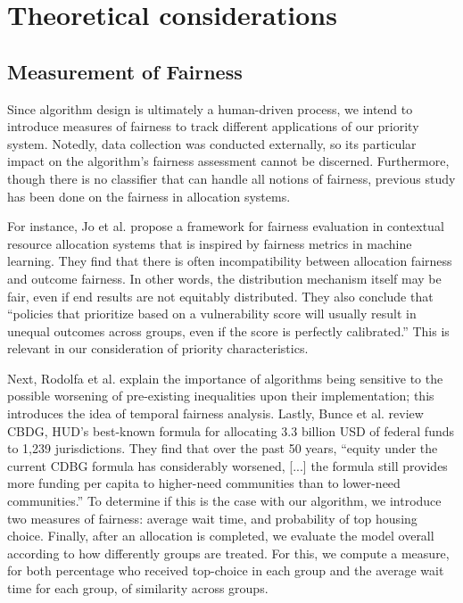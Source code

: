 \documentclass[11pt]{article}
\begin{document}
\section{Theoretical considerations}

\subsection{Measurement of Fairness}

Since algorithm design is ultimately a human-driven process, we intend to introduce measures
of fairness to track different applications of our priority system. Notedly, data collection was conducted externally, so its particular impact on the algorithm’s fairness assessment cannot be discerned. Furthermore, though there is no classifier that can handle all notions of fairness, previous study has been done on the fairness in allocation systems.

For instance, Jo et al. \cite{formulaeval3} propose a framework
for fairness evaluation in contextual resource allocation systems that is inspired by fairness
metrics in machine learning. They find that there is often incompatibility between allocation
fairness and outcome fairness. In other words, the distribution mechanism itself may be fair,
even if end results are not equitably distributed. They also conclude that “policies that prioritize based on a vulnerability score will usually result in unequal outcomes across groups, even if the score is perfectly calibrated.” This is relevant in our consideration of priority characteristics.

Next, Rodolfa et al.\cite{formulaeval2} explain the importance of algorithms being sensitive to
the possible worsening of pre-existing inequalities upon their implementation; this introduces the idea of temporal fairness analysis. Lastly, Bunce et al. \cite{formulaeval} review CBDG,
HUD's best-known formula for allocating 3.3 billion USD of federal funds to 1,239 jurisdictions. They find that over the past 50 years, “equity under the current CDBG formula has considerably worsened, [...] the formula still provides more funding per capita to higher-need communities than to lower-need communities.” To determine if this is the case with our algorithm, we introduce two measures of fairness: average wait time, and probability of top housing choice. Finally, after an allocation is completed, we evaluate the model overall according to how differently groups are treated. For this, we compute a measure, for both percentage who received top-choice in each group and the average wait time for each group, of similarity across groups. 
\end{document}
